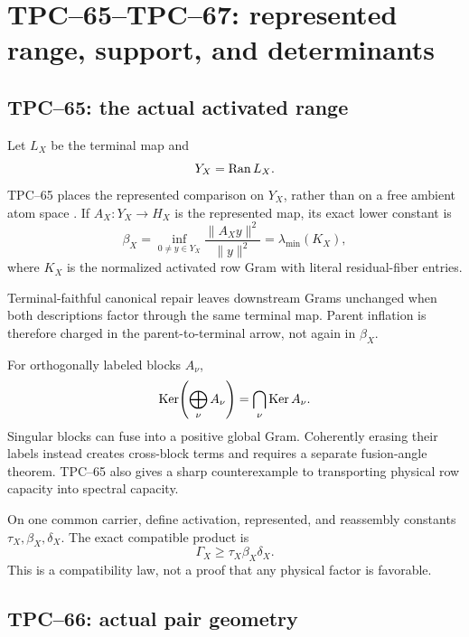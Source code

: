 \section{TPC--65--TPC--67: represented range, support, and determinants}
\label{sec:represented-support}

\subsection{TPC--65: the actual activated range}

Let \(L_X\) be the terminal map and
\[
 Y_X=\operatorname{Ran} L_X.
\]
TPC--65 places the represented comparison on \(Y_X\), rather than on a free
ambient atom space \citep{WangTPC65}.  If \(A_X:Y_X\to H_X\) is the
represented map, its exact lower constant is
\begin{equation}
 \beta_X
 =
 \inf_{0\ne y\in Y_X}
 \frac{\|A_Xy\|^2}{\|y\|^2}
 =
 \lambda_{\min}(K_X),
 \label{eq:tpc72-represented-gram}
\end{equation}
where \(K_X\) is the normalized activated row Gram with literal
residual-fiber entries.

Terminal-faithful canonical repair leaves downstream Grams unchanged when
both descriptions factor through the same terminal map.  Parent inflation
is therefore charged in the parent-to-terminal arrow, not again in
\(\beta_X\).

For orthogonally labeled blocks \(A_\nu\),
\begin{equation}
 \operatorname{Ker}\!\left(\bigoplus_\nu A_\nu\right)
 =
 \bigcap_\nu\operatorname{Ker} A_\nu.
 \label{eq:tpc72-kernel-fusion}
\end{equation}
Singular blocks can fuse into a positive global Gram.  Coherently erasing
their labels instead creates cross-block terms and requires a separate
fusion-angle theorem.  TPC--65 also gives a sharp counterexample to
transporting physical row capacity into spectral capacity.

On one common carrier, define activation, represented, and reassembly
constants \(\tau_X,\beta_X,\delta_X\).  The exact compatible product is
\begin{equation}
 \Gamma_X\ge\tau_X\beta_X\delta_X.
 \label{eq:tpc72-three-stage-product}
\end{equation}
This is a compatibility law, not a proof that any physical factor is
favorable.

\subsection{TPC--66: actual pair geometry}

